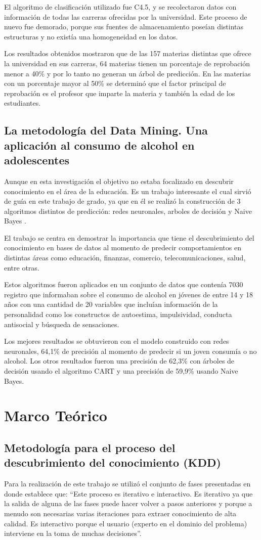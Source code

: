 El algoritmo de clasificación utilizado fue C4.5, y se recolectaron datos con información de todas las carreras ofrecidas por la universidad. Este proceso de nuevo fue demorado, porque sus fuentes de almacenamiento poseían distintas estructuras y no existía una homogeneidad en los datos.

Los resultados obtenidos mostraron que de las 157 materias distintas que ofrece la universidad en sus carreras, 64 materias tienen un porcentaje de reprobación menor a 40\% y por lo tanto no generan un árbol de predicción. En las materias con un porcentaje mayor al 50\% se determinó que el factor principal de reprobación es el profesor que imparte la materia y también la edad de los estudiantes.
\subsection{La metodología del Data Mining. Una aplicación al consumo de alcohol en adolescentes \cite{key-150}}
Aunque en esta investigación el objetivo no estaba focalizado en descubrir conocimiento en el área de la educación. Es un trabajo interesante el cual sirvió de guía en este trabajo de grado, ya que en él se realizó la construcción de 3 algoritmos distintos de predicción: redes neuronales, arboles de decisión y Naive Bayes \cite{key-50}.

El trabajo se centra en demostrar la importancia que tiene el descubrimiento del conocimiento en bases de datos al momento de predecir comportamientos en distintas áreas como educación, finanzas, comercio, telecomunicaciones, salud, entre otras.

Estos algoritmos fueron aplicados en un conjunto de datos que contenía 7030 registro que informaban sobre el consumo de alcohol en jóvenes de entre 14 y 18 años con una cantidad de 20 variables que incluían información de la personalidad como los constructos de autoestima, impulsividad, conducta antisocial y búsqueda de sensaciones.

Los mejores resultados se obtuvieron con el modelo construido con redes neuronales, 64,1\% de precisión al momento de predecir si un joven consumía o no alcohol. Los otros resultados fueron una precisión de 62,3\% con árboles de decisión usando el algoritmo CART \cite{key-50} y una precisión de 59,9\% usando Naive Bayes.
\section{Marco Teórico}
\subsection{Metodología para el proceso del descubrimiento del conocimiento (KDD)}
Para la realización de este trabajo se utilizó el conjunto de fases presentadas en \cite{key-50} donde establece que: ``Este proceso es iterativo e interactivo. Es iterativo ya que la salida de alguna de las fases puede hacer volver a pasos anteriores y porque a menudo son necesarias varias iteraciones para extraer conocimiento de alta calidad. Es interactivo porque el usuario (experto en el dominio del problema) interviene en la toma de muchas decisiones''.

